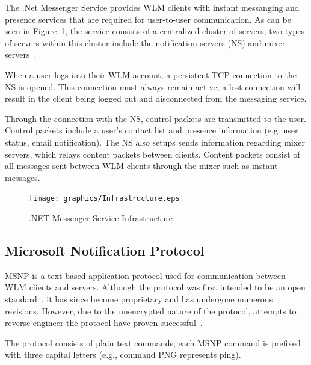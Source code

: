 \documentclass{sig-alternate}
\begin{document}
The .Net Messenger Service provides WLM clients with instant messanging and presence services that are required for user-to-user communication.
As can be seen in Figure~\ref{fig:wlminfrastructure}, the service consists of a centralized cluster of servers; two types of servers within this cluster include the notification servers (NS) and mixer servers~\cite{torre:wlm}.

When a user logs into their WLM account, a persistent TCP connection to the NS is opened.  
This connection must always remain active; a lost connection will result in the client being logged out and disconnected from the messaging service.

Through the connection with the NS, control packets are transmitted to the user. 
Control packets include a user's contact list and presence information (e.g. user status, email notification).
The NS also setups sends information regarding mixer servers, which relays content packets between clients. 
Content packets consist of all messages sent between WLM clients through the mixer such as instant messages.

\begin{figure}[h]
	\centering
	\caption{.NET Messenger Service Infrastructure}
	\label{fig:wlminfrastructure}
	\texttt{[image: graphics/Infrastructure.eps]}
\end{figure}

\subsection{Microsoft Notification Protocol}

MSNP is a text-based application protocol used for communication between WLM clients and servers.
Although the protocol was first intended to be an open standard~\cite{fout:insidewlm}, it has since become proprietary and has undergone numerous revisions.
However, due to the unencrypted nature of the protocol, attempts to reverse-engineer the protocol have proven successful~\cite{hypothetic:msnp, msnfanatic:msnp}.

The protocol consists of plain text commands; each MSNP command is prefixed with three capital letters (e.g., command PNG represents ping).
\end{document}
